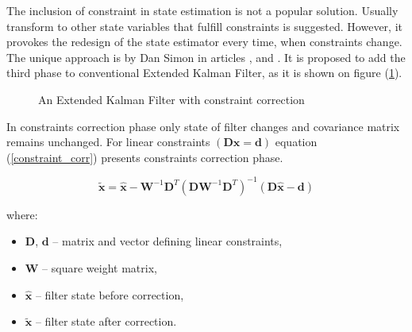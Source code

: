 The inclusion of constraint in state estimation is not a popular solution. Usually transform to other state variables that fulfill constraints is suggested. However, it provokes the redesign of the state estimator every time, when constraints change. The unique approach is by Dan Simon in articles \cite{simon}, \cite{simon2010kalman} and \cite{simon2006kalman}. It is proposed to add the third phase to conventional Extended Kalman Filter, as it is shown on figure (\ref{ekf_three_phases}).

\begin{figure}[!h]
	\begin{center}
	\end{center}
	\caption{An Extended Kalman Filter with constraint correction}
	\label{ekf_three_phases}
\end{figure}

In constraints correction phase only state of filter changes and covariance matrix remains unchanged. For linear constraints $\left( \bm{D} \bm{x} = \bm{d}  \right)$ equation (\ref{constraint_corr}) presents constraints correction phase.

\begin{equation}
	\bm{\tilde{x}} = \bm{\hat{x}} - \bm{W}^{-1} \bm{D}^T \left( \bm{D} \bm{W}^{-1} \bm{D}^T \right)^{-1} \left( \bm{D} \bm{\hat{x}} - \bm{d}  \right)
	\label{constraint_corr}
\end{equation}

where:
\begin{itemize}
	\item $\bm{D}$, $\bm{d}$ -- matrix and vector defining linear constraints,
	\item $\bm{W}$ -- square weight matrix,
	\item $\bm{\hat{x}}$ -- filter state before correction,
	\item $\bm{\tilde{x}}$ -- filter state after correction.
\end{itemize}

